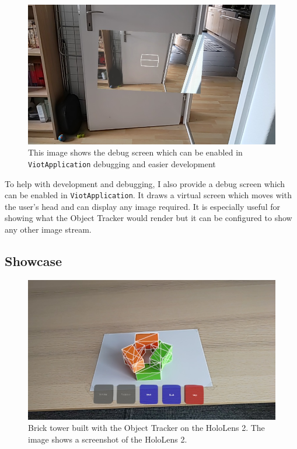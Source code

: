 \begin{figure}
    \centering
    \includegraphics[width=0.9\linewidth]{figures/debug_screen.jpg}
    \caption[Debug Screen for Development]{This image shows the debug screen which can be enabled in \lstinline{ViotApplication} debugging and easier development}
      \label{fig:debugScreen}
\end{figure}

To help with development and debugging, I also provide a debug screen which can be enabled in \lstinline{ViotApplication}. It draws a virtual screen which moves with the user's head and can display any image required. It is especially useful for showing what the Object Tracker would render but it can be configured to show any other image stream.

\subsection{Showcase}

\begin{figure}
    \centering
    \includegraphics[width=0.9\linewidth]{figures/teaser.jpg}
    \caption[Showcase]{Brick tower built with the Object Tracker on the HoloLens 2. The image shows a screenshot of the HoloLens 2.}
      \label{fig:showcase}
\end{figure}

